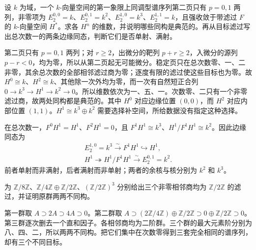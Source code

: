 \begin{exercise}\label{b4:ex:14-two-column-dimensions}
	设 \(k\) 为域，一个 \(k\)-向量空间的第一象限上同调型谱序列第二页只有 \(p=0,1\) 两列，非零项为 \(E_2^{0,0}=k\)、\(E_2^{0,1}=k^2\)、\(E_2^{1,0}=k^3\)、\(E_2^{1,1}=k\)，且强收敛于带滤过 \(F\) 的 \(k\)-向量空间 \(H^*\)。求各 \(H^n\) 的维数，并说明哪些同构是典范的。再从目标滤过写出总次数一的两条边缘同态，判断它们是否单射、满射。
\end{exercise}
\begin{solution}
	第二页只有 \(p=0,1\) 两列；对 \(r\ge2\)，出微分的靶列 \(p+r\ge2\)，入微分的源列 \(p-r<0\)，均为零，所以从第二页起无可能微分。稳定页只在总次数零、一、二非零，其余总次数的全部相邻滤过商为零；逐度有限的滤过使这些目标也为零。故 \(H^0\cong k\)、\(H^2\cong k\)、其他除一次外均为零，而一次有自然短正合列 \(0\to k^3\to H^1\to k^2\to0\)。所以维数依次为一、五、一。次数零、二只有一个非零滤过商，故两处同构都是典范的。其中 \(H^0\) 对应边缘位置 \((0,0)\)，而 \(H^2\) 对应内部位置 \((1,1)\)。\(H^1\cong k^3\oplus k^2\) 需要选择补空间，所给数据没有指定这种选择。

	在总次数一，\(F^0H^1=H^1\)、\(F^2H^1=0\)，且 \(F^1H^1\cong k^3\)、\(H^1/F^1H^1\cong k^2\)。因此边缘同态为
	\[
		\begin{gathered}
			E_2^{1,0}=k^3\xrightarrow{\sim}F^1H^1\hookrightarrow H^1,\\
			H^1\twoheadrightarrow H^1/F^1H^1\xrightarrow{\sim}E_2^{0,1}=k^2.
		\end{gathered}
	\]
	前者单射而非满射，后者满射而非单射；两者的余核与核分别为 \(k^2\) 和 \(k^3\)。
\end{solution}

\begin{exercise}\label{b4:ex:14-order-eight}
	为 \(\mathbb Z/8\mathbb Z\)、\(\mathbb Z/4\mathbb Z\oplus\mathbb Z/2\mathbb Z\)、\((\mathbb Z/2\mathbb Z)^3\) 分别给出三个非零相邻商均为 \(\mathbb Z/2\mathbb Z\) 的滤过，并证明原群两两不同构。
\end{exercise}
\begin{solution}
	第一群取 \(A\supset2A\supset4A\supset0\)。第二群取 \(A\supset(2\mathbb Z/4\mathbb Z)\oplus\mathbb Z/2\mathbb Z\supset0\oplus\mathbb Z/2\mathbb Z\supset0\)。第三群逐次删去一个直和因子。各相邻商均为二阶群。三个群的最大元素阶分别为八、四、二，所以两两不同构。把它们集中在次数零得到三套完全相同的谱序列，却有三个不同目标。
\end{solution}

